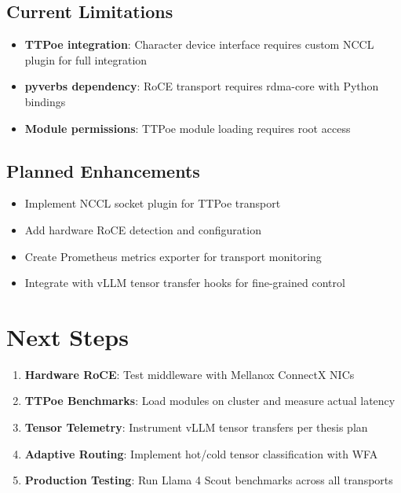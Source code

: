 \documentclass[10pt,letterpaper]{article}
\begin{document}
\subsection{Current Limitations}

\begin{itemize}[noitemsep]
    \item \textbf{TTPoe integration}: Character device interface requires custom NCCL plugin for full integration
    \item \textbf{pyverbs dependency}: RoCE transport requires rdma-core with Python bindings
    \item \textbf{Module permissions}: TTPoe module loading requires root access
\end{itemize}

\subsection{Planned Enhancements}

\begin{itemize}[noitemsep]
    \item Implement NCCL socket plugin for TTPoe transport
    \item Add hardware RoCE detection and configuration
    \item Create Prometheus metrics exporter for transport monitoring
    \item Integrate with vLLM tensor transfer hooks for fine-grained control
\end{itemize}

\section{Next Steps}

\begin{enumerate}[noitemsep]
    \item \textbf{Hardware RoCE}: Test middleware with Mellanox ConnectX NICs
    \item \textbf{TTPoe Benchmarks}: Load modules on cluster and measure actual latency
    \item \textbf{Tensor Telemetry}: Instrument vLLM tensor transfers per thesis plan
    \item \textbf{Adaptive Routing}: Implement hot/cold tensor classification with WFA
    \item \textbf{Production Testing}: Run Llama 4 Scout benchmarks across all transports
\end{enumerate}
\end{document}
